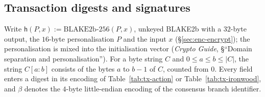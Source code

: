 \documentclass[11pt,a4paper]{article}
\theoremstyle{definition}
\begin{document}
\FloatBarrier
\subsection{Transaction digests and signatures}\label{sec:tx-sighash}

Write $\mathsf{h}(P, x) := \mathrm{BLAKE2b\text{-}256}(P, x)$, unkeyed
BLAKE2b with a $32$-byte output, the $16$-byte personalisation $P$ and the
input $x$ (\S\ref{sec:enc-encrypt}); the personalisation is mixed into the
initialisation vector (\emph{Crypto Guide}, \S``Domain separation and
personalisation''). For a byte string $C$ and $0 \le a \le b \le |C|$, the
string $C[a{:}b]$ consists of the bytes $a$ to $b - 1$ of $C$, counted from
$0$. Every field enters a digest in its encoding of
Table~\ref{tab:tx-action} or Table~\ref{tab:tx-ironwood}, and $\beta$
denotes the $4$-byte little-endian encoding of the consensus branch
identifier.
\end{document}

